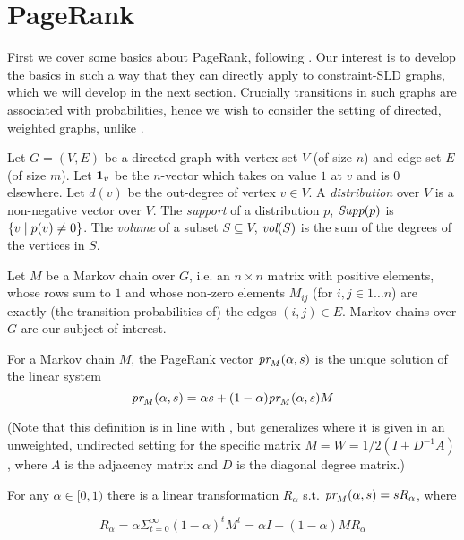 \documentclass{article} %
\begin{document}
\section{PageRank}
First we cover some basics about PageRank, following \cite{Andersen-2006,Andersen-2008}. Our interest is to develop the basics in such a way that they can directly apply to constraint-SLD graphs, which we will develop in the next section. Crucially transitions in such graphs are associated with probabilities, hence we wish to consider the setting of directed, weighted graphs, unlike \cite{Andersen-2006}.

Let $G=(V,E)$ be a directed graph with vertex set $V$ (of size $n$) and edge set $E$ (of size $m$). Let ${\bf 1}_v$ be the $n$-vector which takes on value $1$ at $v$ and is $0$ elsewhere. Let $d(v)$ be the out-degree of vertex $v\in V$. A {\em distribution} over $V$ is a non-negative vector over $V$. The {\em support} of a distribution $p$, $\mbox{\em Supp}(p)$ is $\{v \alt p(v) \not= 0\}$. The {\em volume} of a subset $S \subseteq V$, $\mbox{\em vol}(S)$ is the sum of the degrees of the vertices in $S$. 

Let $M$ be a Markov chain over $G$, i.e.{} an $n \times n$ matrix with positive elements, whose rows sum to $1$ and whose non-zero elements $M_{ij}$ (for $i,j\in 1\ldots n$) are exactly (the transition probabilities of) the edges $(i,j)\in E$. Markov chains over $G$ are our subject of interest.

\begin{definition} For a Markov chain $M$, the PageRank vector $\mbox{\em pr}_M(\alpha, s)$ is the unique solution of the linear system
\begin{equation}
\mbox{\em pr}_M(\alpha, s) = \alpha s + (1 - \alpha)\mbox{\em pr}_M(\alpha, s)M    
\end{equation}
\end{definition}
(Note that this definition is in line with \cite{Andersen-2008}, but generalizes \cite{Andersen-2006} where it is given in an unweighted, undirected setting for the specific matrix $M=W=1/2(I+ D^{-1}A)$, where $A$ is the adjacency matrix and $D$ is the diagonal degree matrix.)

\begin{proposition}\label{Prop:R}
  For any $\alpha \in [0, 1)$ there is a linear transformation $R_{\alpha}$ s.t. $\mbox{\em pr}_M(\alpha, s) = s R_{\alpha}$, where

$$ R_{\alpha} = \alpha \Sigma_{t=0}^{\infty} (1-\alpha)^t M^t = \alpha I + (1-\alpha)M R_{\alpha}$$
\end{proposition}
\end{document}
